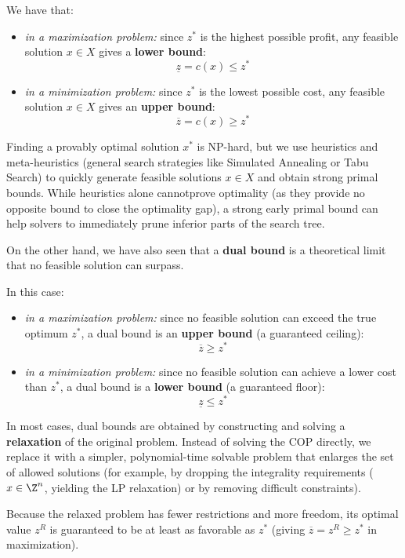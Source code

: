 \documentclass[a4paper, 11pt]{report}
\begin{document}
We have that:
\begin{itemize}
    \item \textit{in a maximization problem:} since $z^*$ is the highest possible profit, any feasible solution $x \in X$ gives a \textbf{lower bound}:
    $$ \underline{z} = c(x) \leq z^* $$
    \item \textit{in a minimization problem:} since $z^*$ is the lowest possible cost, any feasible solution $x \in X$ gives an \textbf{upper bound}:
    $$ \overline{z} = c(x) \geq z^* $$
\end{itemize}

Finding a provably optimal solution $x^*$ is NP-hard, but we use heuristics and meta-heuristics (general search strategies like Simulated Annealing or Tabu Search) to quickly generate feasible solutions $x \in X$ and obtain strong primal bounds. While heuristics alone cannotprove optimality (as they provide no opposite bound to close the optimality gap), a strong early primal bound can help solvers to immediately prune inferior parts of the search tree.

On the other hand, we have also seen that a \textbf{dual bound} is a theoretical limit that no feasible solution can surpass. 

In this case:
\begin{itemize}
    \item \textit{in a maximization problem:} since no feasible solution can exceed the true optimum $z^*$, a dual bound is an \textbf{upper bound} (a guaranteed ceiling):
    $$ \overline{z} \geq z^* $$
    \item \textit{in a minimization problem:} since no feasible solution can achieve a lower cost than $z^*$, a dual bound is a \textbf{lower bound} (a guaranteed floor):
    $$ \underline{z} \leq z^* $$
\end{itemize}

In most cases, dual bounds are obtained by constructing and solving a \textbf{relaxation} of the original problem. Instead of solving the COP directly, we replace it with a simpler, polynomial-time solvable problem that enlarges the set of allowed solutions (for example, by dropping the integrality requirements ($x \in \Z^n$, yielding the LP relaxation) or by removing difficult constraints). 

Because the relaxed problem has fewer restrictions and more freedom, its optimal value $z^R$ is guaranteed to be at least as favorable as $z^*$ (giving $\overline{z} = z^R \geq z^*$ in maximization).
\end{document}
